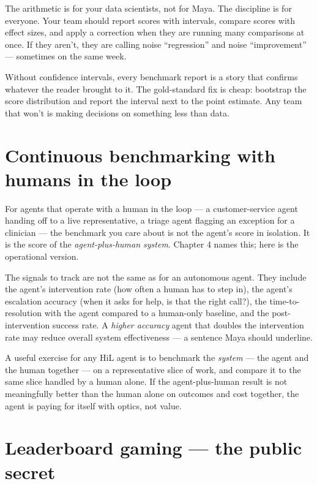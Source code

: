 The arithmetic is for your data scientists, not for Maya. The discipline is for everyone. Your team should report scores with intervals, compare scores with effect sizes, and apply a correction when they are running many comparisons at once. If they aren't, they are calling noise ``regression'' and noise ``improvement'' --- sometimes on the same week.

\begin{TNwarning} Without confidence intervals, every benchmark report is a story that confirms whatever the reader brought to it. The gold-standard fix is cheap: bootstrap the score distribution and report the interval next to the point estimate. Any team that won't is making decisions on something less than data. \end{TNwarning}

\section{Continuous benchmarking with humans in the loop}

For agents that operate with a human in the loop --- a customer-service agent handing off to a live representative, a triage agent flagging an exception for a clinician --- the benchmark you care about is not the agent's score in isolation. It is the score of the \textit{agent-plus-human system}. Chapter 4 names this; here is the operational version.

The signals to track are not the same as for an autonomous agent. They include the agent's intervention rate (how often a human has to step in), the agent's escalation accuracy (when it asks for help, is that the right call?), the time-to-resolution with the agent compared to a human-only baseline, and the post-intervention success rate. A \textit{higher accuracy} agent that doubles the intervention rate may reduce overall system effectiveness --- a sentence Maya should underline.

A useful exercise for any HiL agent is to benchmark the \textit{system} --- the agent and the human together --- on a representative slice of work, and compare it to the same slice handled by a human alone. If the agent-plus-human result is not meaningfully better than the human alone on outcomes and cost together, the agent is paying for itself with optics, not value.

\section{Leaderboard gaming --- the public secret}

